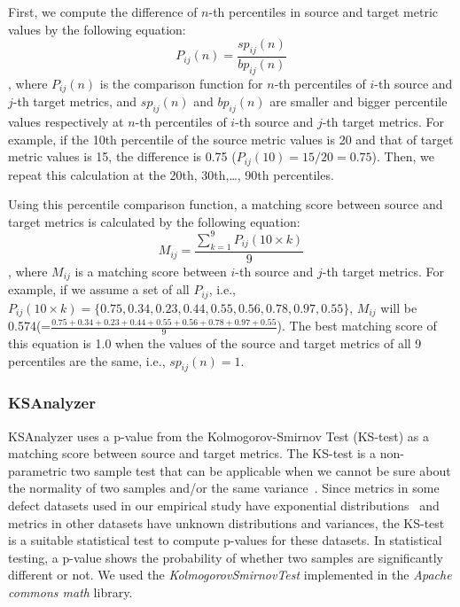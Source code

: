 First, we compute the difference of $n$-th
percentiles in source and target metric values by the following
equation:
\begin{equation}
P_{ij}(n)=\frac{sp_{ij}(n)}{bp_{ij}(n)}
\end{equation}
, where $P_{ij}(n)$ is the comparison function for $n$-th percentiles
of $i$-th source and $j$-th target metrics, and $sp_{ij}(n)$ and $bp_{ij}(n)$
are smaller and bigger percentile values respectively at $n$-th percentiles
of $i$-th source and $j$-th target metrics. For example, if the 10th
percentile of the source metric values is 20 and that of target metric values is
15, the difference is 0.75 ($P_{ij}(10)=15/20=0.75$). Then, we repeat this calculation at the 20th, 30th,\ldots, 90th percentiles.

Using this percentile comparison function, a matching score between source
and target metrics is calculated by the following equation:
\begin{equation}
M_{ij}=\frac{\sum\limits_{k=1}^9
P_{ij}(10\times{k})}{9}\end{equation}
, where $M_{ij}$ is a matching score between $i$-th source and $j$-th
target metrics. For example, if we assume a set of all $P_{ij}$, i.e., $P_{ij}{(10\times{k})}=\{0.75, 0.34, 0.23, 0.44, 0.55, 0.56, 0.78, 0.97, 0.55\}$, $M_{ij}$ will be 0.574(=$\frac{0.75+0.34+0.23+0.44+0.55+0.56+0.78+0.97+0.55}{9}$). The best matching score of this equation is 1.0
when the values of the source and target metrics of all 9 percentiles are the
same, i.e., $sp_{ij}(n)=1$.

\subsubsection{KSAnalyzer}
KSAnalyzer uses a p-value from the Kolmogorov-Smirnov Test (KS-test)
as a matching score between source and target metrics. The KS-test is a
non-parametric two sample test that can be applicable when we cannot be sure
about the normality of two samples and/or the same
variance~\cite{Lilliefors67,Massey51}. Since metrics in some defect datasets
used in our empirical study have exponential distributions~\cite{Menzies07} and
metrics in other datasets have unknown distributions and variances, the KS-test
is a suitable statistical test to compute p-values for these datasets. In statistical testing, a p-value shows the
probability of whether two samples are significantly different or not. We used
the {\em KolmogorovSmirnovTest} implemented in the {\em Apache commons math}
library.


